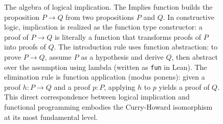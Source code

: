 \documentclass[letterpaper]{article}
\begin{document}
\begin{figure}[h!]
\begin{tikzpicture}[node distance=2cm and 2.5cm]
\end{tikzpicture}
\caption{The algebra of logical implication. The Implies function builds the proposition
$P \to Q$ from two propositions $P$ and $Q$. In constructive logic, implication is 
realized as the function type constructor: a proof of $P \to Q$ is literally a function 
that transforms proofs of $P$ into proofs of $Q$. The introduction rule uses function 
abstraction: to prove $P \to Q$, assume $P$ as a hypothesis and derive $Q$, then 
abstract over the assumption using lambda (written as \texttt{fun} in Lean). The 
elimination rule is function application (modus ponens): given a proof $h : P \to Q$ 
and a proof $p : P$, applying $h$ to $p$ yields a proof of $Q$. This direct 
correspondence between logical implication and functional programming embodies the 
Curry-Howard isomorphism at its most fundamental level.}\label{fig:tikz_diagram_implies}
\end{figure}
\end{document}
